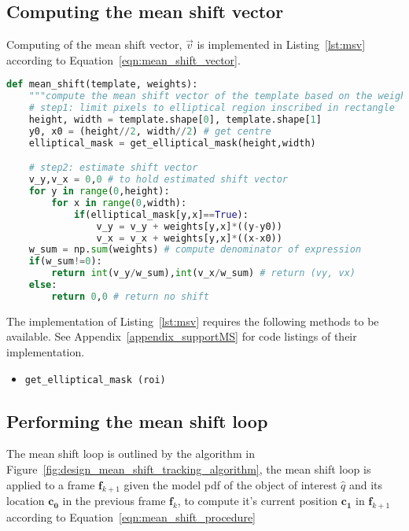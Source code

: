 \subsection{Computing the mean shift vector}
Computing of the mean shift vector, $\vec{v}$ is implemented in Listing~\ref{lst:msv}
according to Equation~\ref{eqn:mean_shift_vector}.

\begin{lstlisting}[language=Python, caption={Function computing the mean shift vector}, captionpos=b, label={lst:msv}]
def mean_shift(template, weights):
    """compute the mean shift vector of the template based on the weights"""
    # step1: limit pixels to elliptical region inscribed in rectangle
    height, width = template.shape[0], template.shape[1]
    y0, x0 = (height//2, width//2) # get centre 
    elliptical_mask = get_elliptical_mask(height,width)

    # step2: estimate shift vector
    v_y,v_x = 0,0 # to hold estimated shift vector
    for y in range(0,height):
        for x in range(0,width): 
            if(elliptical_mask[y,x]==True):
                v_y = v_y + weights[y,x]*((y-y0)) 
                v_x = v_x + weights[y,x]*((x-x0))
    w_sum = np.sum(weights) # compute denominator of expression
    if(w_sum!=0):
        return int(v_y/w_sum),int(v_x/w_sum) # return (vy, vx)
    else:
        return 0,0 # return no shift
\end{lstlisting}

The implementation of Listing~\ref{lst:msv} requires the following methods to
be available. See Appendix~\ref{appendix_supportMS} for code listings of their implementation. 
\begin{itemize}
    \item \lstinline{get_elliptical_mask (roi)}
\end{itemize}

\subsection{Performing the mean shift loop}
The mean shift loop is outlined by the algorithm in
Figure~\ref{fig:design_mean_shift_tracking_algorithm}, the mean shift loop is
applied to a frame $\mathbf{f}_{k+1}$ given the model pdf of the object of
interest $\hat{q}$ and its location $\mathbf{c_0}$ in the previous frame
$\mathbf{f}_{k}$, to compute it's current position $\mathbf{c_1}$ in
$\mathbf{f}_{k+1}$ according to Equation~\ref{eqn:mean_shift_procedure} 

